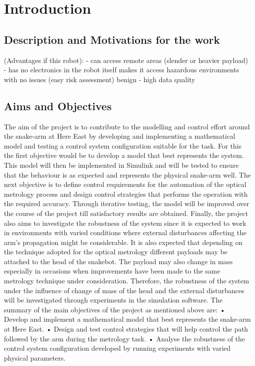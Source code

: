 \documentclass[a4paper,12pt]{report}
\begin{document}
\pagebreak



\tableofcontents

\pagebreak

\begin{abstract}
    \ldots
\end{abstract}

\chapter{Introduction}
\section{Description and Motivations for the work}
(Advantages if this robot):
- can access remote areas (slender or heavier payload)
- has no electronics in the robot itself makes it access hazardous environments with no issues (easy risk assessment) benign 
- high data quality 
\section{Aims and Objectives}
The aim of the project is to contribute to the modelling and control effort around the snake-arm at Here East by developing and implementing a mathematical model and testing a control system configuration suitable for the task.
For this the first objective would be to develop a model that best represents the system. This model will then be implemented in Simulink and will be tested to ensure that the behaviour is as expected and represents the physical snake-arm well. 
The next objective is to define control requirements for the automation of the optical metrology process and design control strategies that performs the operation with the required accuracy. Through iterative testing, the model will be improved over the course of the project till satisfactory results are obtained.
Finally, the project also aims to investigate the robustness of the system since it is expected to work in environments with varied conditions where external disturbances affecting the arm’s propagation might be considerable. It is also expected that depending on the technique adopted for the optical metrology different payloads may be attached to the head of the snakebot. The payload may also change in mass especially in occasions when improvements have been made to the same metrology technique under consideration. Therefore, the robustness of the system under the influence of change of mass of the head and the external disturbances will be investigated through experiments in the simulation software.
The summary of the main objectives of the project as mentioned above are:
•	Develop and implement a mathematical model that best represents the snake-arm at Here East.
•	Design and test control strategies that will help control the path followed by the arm during the metrology task.
•	Analyse the robustness of the control system configuration developed by running experiments with varied physical parameters.
\end{document}
